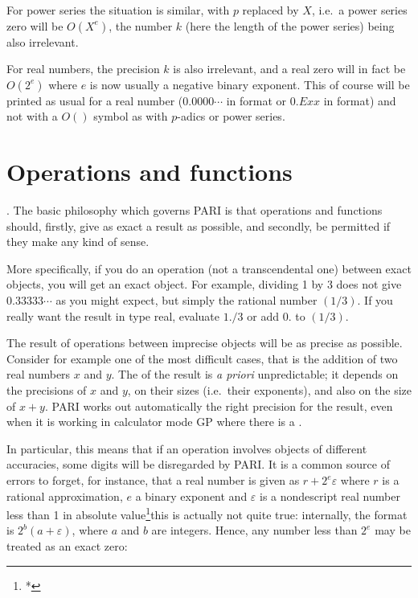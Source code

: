For power series the situation is similar, with $p$ replaced by $X$, i.e.~a
power series zero will be $O(X^e)$, the number $k$ (here the length of the
power series) being also irrelevant.\label{se:whatzero}

For real numbers, the precision $k$ is also irrelevant, and a real zero will
in fact be $O(2^e)$ where $e$ is now usually a negative binary exponent. This
of course will be printed as usual for a real number ($0.0000\cdots$ in
 format or $0.Exx$ in  format) and not with a $O()$ symbol as
with $p$-adics or power series.

\section{Operations and functions}

.
The basic philosophy which governs PARI is that operations and functions
should, firstly, give as exact a result as possible, and secondly, be
permitted if they make any kind of sense.

More specifically, if you do an operation (not a transcendental one) between
exact objects, you will get an exact object. For example, dividing 1 by 3
does not give $0.33333\cdots$ as you might expect, but simply the rational
number $(1/3)$. If you really want the result in type real, evaluate $1./3$
or add $0.$ to $(1/3)$.

The result of operations between imprecise objects will be as precise as
possible. Consider for example one of the most difficult cases, that is the
addition of two real numbers $x$ and $y$. The  of the result is
{\it a priori\/} unpredictable; it depends on the precisions of $x$ and $y$,
on their sizes (i.e.~their exponents), and also on the size of $x+y$. PARI
works out automatically the right precision for the result, even when it is
working in calculator mode GP where there is a .

In particular, this means that if an operation involves objects of
different accuracies, some digits will be disregarded by PARI. It is a
common source of errors to forget, for instance, that a real number is
given as $r + 2^e \varepsilon$ where $r$ is a rational approximation, $e$ a
binary exponent and $\varepsilon$ is a nondescript real number less than 1 in
absolute value\footnote{*}{this is actually not quite true: internally, the
format is $2^b (a + \varepsilon)$, where $a$ and $b$ are integers}. Hence,
any number less than $2^e$ may be treated as an exact zero:

